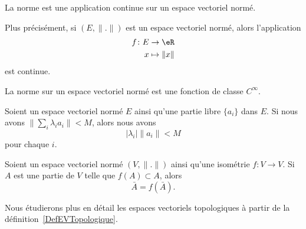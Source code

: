 \begin{proposition}     \label{PROPooYMCUooERvDpk}
	La norme est une application continue sur un espace vectoriel normé.

	Plus précisément, si \( (E,\| . \|)\) est un espace vectoriel normé, alors l'application
	\begin{equation}
		\begin{aligned}
			f\colon E & \to \eR         \\
			x         & \mapsto \| x \|
		\end{aligned}
	\end{equation}
	est continue.
\end{proposition}

\begin{proposition}     \label{PROPooQUAZooGXskwF}
    La norme sur un espace vectoriel normé est une fonction de classe \(  C^{\infty}\).
\end{proposition}

\begin{lemma}        \label{LEMooGCJEooOAynZW}
	Soient un espace vectoriel normé \( E\) ainsi qu'une partie libre \( \{ a_i \}\) dans \( E\). Si nous avons \( \| \sum_i\lambda_ia_i \|<M\), alors nous avons
	\begin{equation}
		| \lambda_i |\| a_i \|<M
	\end{equation}
	pour chaque \( i\).
\end{lemma}

\begin{lemma}       \label{LEMooSCIIooRyRrHA}
	Soient un espace vectoriel normé \( (V,\| . \|)\) ainsi qu'une isométrie \( f\colon V\to V\). Si \( A\) est une partie de \( V\) telle que \( f(A)\subset A\), alors
	\begin{equation}
		\bar A=f(\bar A).
	\end{equation}
\end{lemma}


Nous étudierons plus en détail les espaces vectoriels topologiques à partir de la définition~\ref{DefEVTopologique}.

